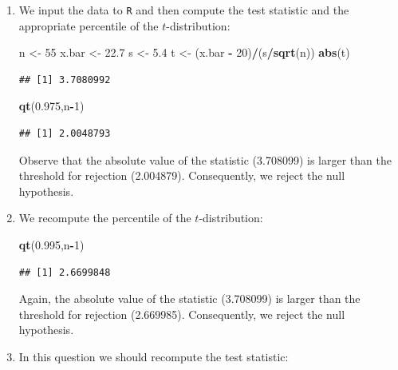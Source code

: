 \documentclass[]{krantz}
\makeatletter
\newenvironment{Shaded}{\begin{snugshade}}{\end{snugshade}}
\newcommand{\KeywordTok}[1]{\textcolor[rgb]{0.13,0.29,0.53}{\textbf{#1}}}
\newcommand{\DecValTok}[1]{\textcolor[rgb]{0.00,0.00,0.81}{#1}}
\newcommand{\FloatTok}[1]{\textcolor[rgb]{0.00,0.00,0.81}{#1}}
\newcommand{\StringTok}[1]{\textcolor[rgb]{0.31,0.60,0.02}{#1}}
\newcommand{\OperatorTok}[1]{\textcolor[rgb]{0.81,0.36,0.00}{\textbf{#1}}}
\newcommand{\NormalTok}[1]{#1}
\newenvironment{kframe}{%
\medskip{}
\setlength{\fboxsep}{.8em}
 \def\at@end@of@kframe{}%
 \ifinner\ifhmode%
  \def\at@end@of@kframe{\end{minipage}}%
  \begin{minipage}{\columnwidth}%
 \fi\fi%
 \def\FrameCommand##1{\hskip\@totalleftmargin \hskip-\fboxsep
 \colorbox{shadecolor}{##1}\hskip-\fboxsep
     \hskip-\linewidth \hskip-\@totalleftmargin \hskip\columnwidth}%
 \MakeFramed {\advance\hsize-\width
   \@totalleftmargin\z@ \linewidth\hsize
   \@setminipage}}%
 {\par\unskip\endMakeFramed%
 \at@end@of@kframe}
\renewenvironment{Shaded}{\begin{kframe}}{\end{kframe}}
\theoremstyle{definition}
\theoremstyle{definition}
\theoremstyle{definition}
\theoremstyle{remark}
\makeatother
\begin{document}
\begin{enumerate}
\def\labelenumi{\arabic{enumi}.}
\item
  We input the data to \texttt{R} and then compute the test statistic
  and the appropriate percentile of the \(t\)-distribution:

\begin{Shaded}
\begin{Highlighting}[]
\NormalTok{n <-}\StringTok{ }\DecValTok{55}
\NormalTok{x.bar <-}\StringTok{ }\FloatTok{22.7}
\NormalTok{s <-}\StringTok{ }\FloatTok{5.4}
\NormalTok{t <-}\StringTok{ }\NormalTok{(x.bar }\OperatorTok{-}\StringTok{ }\DecValTok{20}\NormalTok{)}\OperatorTok{/}\NormalTok{(s}\OperatorTok{/}\KeywordTok{sqrt}\NormalTok{(n))}
\KeywordTok{abs}\NormalTok{(t)}
\end{Highlighting}
\end{Shaded}

\begin{verbatim}
## [1] 3.7080992
\end{verbatim}

\begin{Shaded}
\begin{Highlighting}[]
\KeywordTok{qt}\NormalTok{(}\FloatTok{0.975}\NormalTok{,n}\OperatorTok{-}\DecValTok{1}\NormalTok{)}
\end{Highlighting}
\end{Shaded}

\begin{verbatim}
## [1] 2.0048793
\end{verbatim}

  Observe that the absolute value of the statistic (3.708099) is larger
  than the threshold for rejection (2.004879). Consequently, we reject
  the null hypothesis.
\item
  We recompute the percentile of the \(t\)-distribution:

\begin{Shaded}
\begin{Highlighting}[]
\KeywordTok{qt}\NormalTok{(}\FloatTok{0.995}\NormalTok{,n}\OperatorTok{-}\DecValTok{1}\NormalTok{)}
\end{Highlighting}
\end{Shaded}

\begin{verbatim}
## [1] 2.6699848
\end{verbatim}

  Again, the absolute value of the statistic (3.708099) is larger than
  the threshold for rejection (2.669985). Consequently, we reject the
  null hypothesis.
\item
  In this question we should recompute the test statistic:


\end{enumerate}
\end{document}

